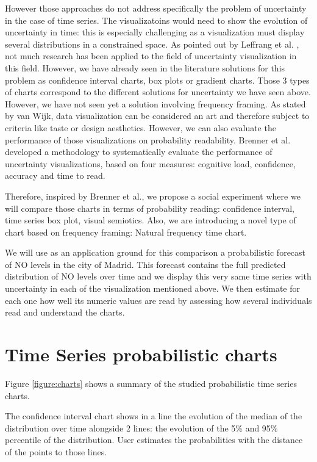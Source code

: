 \documentclass[a4paper,3p,sort&compress]{elsarticle}
\begin{document}
However those approaches do not address specifically the problem of uncertainty in the case of time series.
The visualizatoins would need to show the evolution of uncertainty in time: this 
is especially challenging as a visualization must display several distributions in a constrained space.  
As pointed out by Leffrang et al. \cite{leffrang_should_2021}, not much research has been applied to the 
field of uncertainty visualization in this field. 
However, we have already seen in the literature solutions for this problem as confidence interval charts,
 box plots or gradient charts. Those 3 types of charts correspond to the different solutions for uncertainty 
 we have seen above. However, we have not seen yet a solution involving frequency framing. As stated by van Wijk,
 data visualization can be considered an art and therefore subject to criteria like taste or design aesthetics. 
However, we can also evaluate the performance of those visualizations on probability readability.
Brenner et al. \cite{brennen_instrument_2018} developed a methodology to systematically evaluate the performance
of uncertainty visualizations, based on four measures: cognitive load, confidence, accuracy and time to read. 

Therefore, inspired by Brenner et al., we propose a social experiment where we will compare those charts 
in terms of probability reading: confidence interval, time series box plot, visual semiotics.
Also, we are introducing a novel type of chart based on frequency framing: Natural frequency time chart.

We will use as an application ground for this comparison a probabilistic forecast of NO levels 
in the city of Madrid. This forecast contains the full predicted distribution of NO levels over time
and we display this very same time series with uncertainty in each of the visualization mentioned above. 
We then estimate for each one how well its numeric values are read by assessing how several individuals read 
and understand the charts.

\section{Time Series probabilistic charts}  
\label{sec:time_series}

Figure \ref{figure:charts} shows a summary of the studied probabilistic time series charts.

The confidence interval chart shows in a line the evolution of the median of the distribution
 over time alongside 2 lines: the evolution of the 5\% and 95\% percentile of the distribution. 
 User estimates the probabilities with the distance of the points to those lines.
\end{document}
